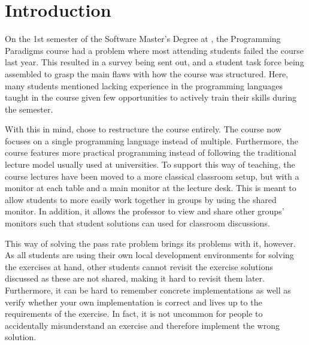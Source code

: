 \chapter{Introduction} \label{chap:introduction}
On the 1st semester of the Software Master’s Degree at \aau{}, the Programming Paradigms course had a problem where most attending students failed the course last year. 
This resulted in a survey being sent out, and a student task force being assembled to grasp the main flaws with how the course was structured. 
Here, many students mentioned lacking experience in the programming languages taught in the course given few opportunities to actively train their skills during the semester. 


With this in mind, \aau{} chose to restructure the course entirely. 
The course now focuses on a single programming language instead of multiple. 
Furthermore, the course features more practical programming instead of following the traditional lecture model usually used at universities. 
To support this way of teaching, the course lectures have been moved to a more classical classroom setup, but with a monitor at each table and a main monitor at the lecture desk. 
This is meant to allow students to more easily work together in groups by using the shared monitor.
In addition, it allows the professor to view and share other groups' monitors such that student solutions can used for classroom discussions. 


This way of solving the pass rate problem brings its problems with it, however. As all students are using their own local development environments for solving the exercises at hand, other students cannot revisit the exercise solutions discussed as these are not shared, making it hard to revisit them later. Furthermore, it can be hard to remember concrete implementations as well as verify whether your own implementation is correct and lives up to the requirements of the exercise. In fact, it is not uncommon for people to accidentally misunderstand an exercise and therefore implement the wrong solution.  

